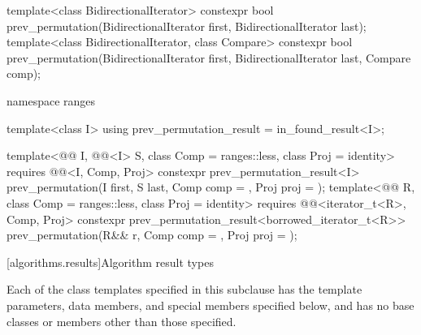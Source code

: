 \begin{codeblock}
{  template<class BidirectionalIterator>
    constexpr bool prev_permutation(BidirectionalIterator first,
                                    BidirectionalIterator last);
  template<class BidirectionalIterator, class Compare>
    constexpr bool prev_permutation(BidirectionalIterator first,
                                    BidirectionalIterator last, Compare comp);

  namespace ranges {
    template<class I>
      using prev_permutation_result = in_found_result<I>;

    template<@@ I, @@<I> S, class Comp = ranges::less,
             class Proj = identity>
      requires @@<I, Comp, Proj>
      constexpr prev_permutation_result<I>
        prev_permutation(I first, S last, Comp comp = {}, Proj proj = {});
    template<@@ R, class Comp = ranges::less,
             class Proj = identity>
      requires @@<iterator_t<R>, Comp, Proj>
      constexpr prev_permutation_result<borrowed_iterator_t<R>>
        prev_permutation(R&& r, Comp comp = {}, Proj proj = {});
  }
}
\end{codeblock}

[algorithms.results]{Algorithm result types}

\pnum
Each of the class templates specified in this subclause
has the template parameters, data members, and special members specified below,
and has no base classes or members other than those specified.

